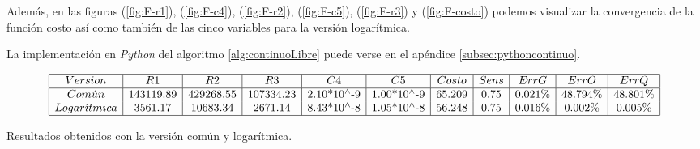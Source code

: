 \documentclass{llncs}
\begin{document}
	Además, en las figuras (\ref{fig:F-r1}), (\ref{fig:F-c4}), (\ref{fig:F-r2}), (\ref{fig:F-c5}), (\ref{fig:F-r3}) y (\ref{fig:F-costo}) 
	podemos visualizar la convergencia de la función costo así como también de las cinco variables para la versión logarítmica.
	
	La implementación en \textit{Python} del algoritmo \ref{alg:continuoLibre} puede verse en el apéndice \ref{subsec:pythoncontinuo}.
	
	\begin{table}[!h]
		$$
		\begin{array}{|c|c|c|c|c|c|c|c|c|c|c|}
		\hline
		Version & R1 & R2 & R3 & C4 & C5 & Costo & Sens & ErrG & ErrO & ErrQ \\
		\hline
		Com\acute{u}n & 143119.89 & 429268.55 & 107334.23 & \text{2.10*10${}^{\wedge}$-9} & \text{1.00*10${}^{\wedge}$-9} & 65.209 & 0.75 & 0.021\% & 48.794\% & 48.801\% \\
		Logar\acute{\imath}tmica & 3561.17 & 10683.34 & 2671.14 & \text{8.43*10${}^{\wedge}$-8} & \text{1.05*10${}^{\wedge}$-8} & 56.248 & 0.75 & 0.016\% & 0.002\% & 0.005\% \\
		\hline
		\end{array}
		$$
		\caption{Resultados obtenidos con la versión común y logarítmica.}
		\label{cuadroSols1}
	\end{table}
	
\end{document}
